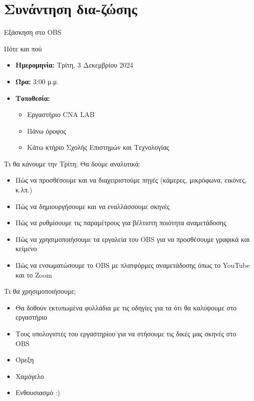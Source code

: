 \documentclass[aspectratio=169]{beamer}
\begin{document}
\section{Συνάντηση δια-ζώσης}
\begin{frame}[allowframebreaks]{Εξάσκηση στο OBS}
  \begin{alertblock}{Πότε και πού}
    \begin{itemize}
      \item \textbf{Ημερομηνία:} Τρίτη, 3 Δεκεμβρίου 2024
      \item \textbf{Ώρα:} 3:00 μ.μ.
      \item \textbf{Τοποθεσία:}
            \begin{itemize}
              \item Εργαστήριο CNA LAB
              \item Πάνω όροφος
              \item Κάτω κτήριο Σχολής Επιστημών και Τεχνολογίας
            \end{itemize}
    \end{itemize}
  \end{alertblock}
  \begin{exampleblock}{Τι θα κάνουμε την Τρίτη;}
    Θα δούμε αναλυτικά:
    \begin{itemize}
      \item Πώς να προσθέσουμε και να διαχειριστούμε πηγές (κάμερες, μικρόφωνα, εικόνες, κ.λπ.)
      \item Πώς να δημιουργήσουμε και να εναλλάσσουμε σκηνές
      \item Πώς να ρυθμίσουμε τις παραμέτρους για βέλτιστη ποιότητα αναμετάδοσης
      \item Πώς να χρησιμοποιήσουμε τα εργαλεία του OBS για να προσθέσουμε γραφικά και κείμενο
      \item Πώς να ενσωματώσουμε το OBS με πλατφόρμες αναμετάδοσης όπως το YouTube και το Zoom
    \end{itemize}
  \end{exampleblock}
  \begin{exampleblock}
    {Τι θα χρησιμοποιήσουμε;}
    \begin{itemize}
      \item Θα δοθούν εκτυπωμένα φυλλάδια με τις οδηγίες για τα ότι θα καλύψουμε στο εργαστήριο
      \item Τους υπολογιστές του εργαστηρίου για να στήσουμε τις δικές μας σκηνές στο OBS
      \item Όρεξη
      \item Χαμόγελο
      \item Ενθουσιασμό :)
    \end{itemize}
  \end{exampleblock}
\end{frame}
\end{document}
